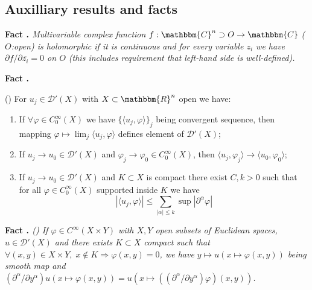 \documentclass{article}
\newcommand{\nin}{\not\in}
\newcommand{\tmtextbf}[1]{{\bfseries{#1}}}
\newcommand{\tmtextit}[1]{{\itshape{#1}}}
\newcommand{\tmtextup}[1]{{\upshape{#1}}}
\numberwithin{definition}{section}
\numberwithin{lemma}{section}
\numberwithin{proposition}{section}
{\theorembodyfont{\rmfamily}\newtheorem{remark}{Remark}
\numberwithin{remark}{section}
}
\begin{document}
\subsection{Auxilliary results and facts}

{\noindent}\tmtextbf{Fact \tmtextup{4}.
}\tmtextit{\label{holomorphicity-preserving:fact-holo}Multivariable complex
function $f : \mathbbm{C}^n \supset O \rightarrow \mathbbm{C}$ ($O$:open) is
holomorphic if it is continuous and for every variable $z_i$ we have $\partial
f / \partial \overline{z_i} = 0$ on $O$ (this includes requirement that
left-hand side is well-defined).}{\hspace*{\fill}}{\medskip}

{\noindent}\tmtextbf{Fact \tmtextup{5}.
}\tmtextit{\label{holomorphicity-preserving:fact-completeness}({\cite[thm.
2.1.8]{hormander1983analysis}}) For $u_j \in \mathcal{D}' ( X)$ with $X
\subset \mathbbm{R}^n$ open we have:
\begin{enumerate}
  \item If $\forall \varphi \in C_0^{\infty} ( X)$ we have $\{ \langle u_j,
  \varphi \rangle \}_j$ being convergent sequence, then mapping $\varphi
  \mapsto \lim_j \langle u_j, \varphi \rangle$ defines element of
  $\mathcal{D}' ( X)$;
  
  \item If $u_j \rightarrow u_0 \in \mathcal{D}' ( X)$ and $\varphi_j
  \rightarrow \varphi_0 \in C^{\infty}_0 ( X)$, then $\langle u_j, \varphi_j
  \rangle \rightarrow \langle u_0, \varphi_0 \rangle$;
  
  \item If $u_j \rightarrow u_0 \in \mathcal{D}' ( X)$ and $K \subset X$ is
  compact there exist $C, k > 0$ such that for all $\varphi \in C_0^{\infty} (
  X)$ supported inside $K$ we have
  \[ | \langle u_j, \varphi \rangle | \leqslant \sum_{| \alpha | \leqslant k}
     \sup | \partial^{\alpha} \varphi | \]
\end{enumerate}}{\hspace*{\fill}}{\medskip}

{\noindent}\tmtextbf{Fact \tmtextup{6}.
}\tmtextit{\label{holomorphicity-preserving:fact-basic}({\cite[thm.
2.1.3]{hormander1983analysis}}) If $\varphi \in C^{\infty} ( X \times Y)$ with
$X, Y$ open subsets of Euclidean spaces, $u \in \mathcal{D}' ( X)$ and there
exists $K \subset X$ compact such that $\forall ( x, y) \in X \times Y, \; x
\nin K \Rightarrow \varphi ( x, y) = 0$, we have $y \mapsto u ( x \mapsto
\varphi ( x, y))$ being smooth map and $( \partial^{\alpha} / \partial
y^{\alpha}) u ( x \mapsto \varphi ( x, y)) = u ( x \mapsto ( (
\partial^{\alpha} / \partial y^{\alpha}) \varphi) ( x,
y))$.}{\hspace*{\fill}}{\medskip}
\end{document}
